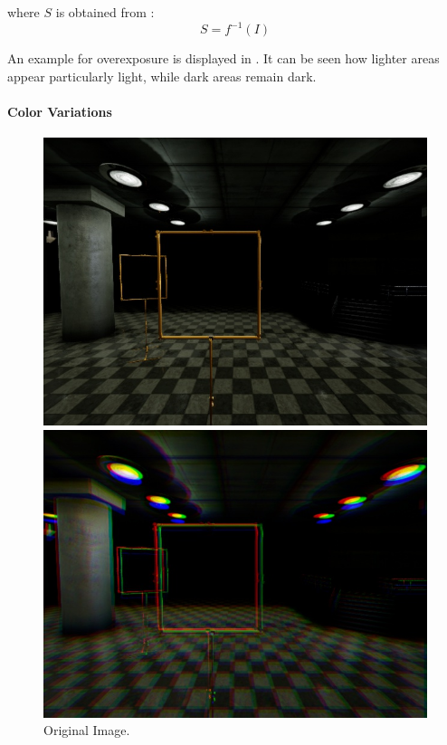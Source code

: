 where $S$ is obtained from :
\begin{equation}
S = f^{-1}(I)
\end{equation}

An example for overexposure is displayed in . It can be seen how lighter areas appear particularly light, while dark areas remain dark.

\paragraph{Color Variations}



\begin{figure}[htbp]
	\centering
	\begin{minipage}{0.33\textwidth}
		\includegraphics[width=\textwidth]{fig/gate_example}
		\caption{Original Image.}
		\label{fig:orig}
	\end{minipage}
	\begin{minipage}{0.33\textwidth}
		\includegraphics[width=\textwidth]{fig/gate_example_chromatic}

\end{minipage}
\end{figure}
